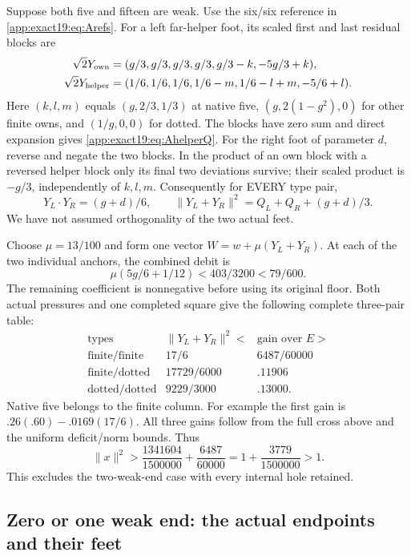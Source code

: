 \documentclass[11pt]{article}
\theoremstyle{definition}
\theoremstyle{remark}
\begin{document}
Suppose both five and fifteen
are weak.
Use the six/six reference in
\eqref{app:exact19:eq:Arefs}.
For a left far-helper foot,
its scaled first and last residual
blocks are
\[
\begin{split}
 \sqrt2Y_{\rm own}&=(g/3,g/3,g/3,g/3,g/3-k,-5g/3+k),\\
 \sqrt2Y_{\rm helper}&=(1/6,1/6,1/6,1/6-m,1/6-l+m,-5/6+l).
\end{split}
\]
Here \((k,l,m)\) equals
\((g,2/3,1/3)\) at native five,
\((g,2(1-g^2),0)\) for other finite
owns, and \((1/g,0,0)\) for dotted.
The blocks have zero sum and
direct expansion gives
\eqref{app:exact19:eq:AhelperQ}.
For the right foot of parameter
\(d\), reverse and negate the two
blocks.
In the product of an own block
with a reversed helper block only
its final two deviations survive;
their scaled product is \(-g/3\),
independently of \(k,l,m\).
Consequently for EVERY type pair,
\[
 Y_L\cdot Y_R=(g+d)/6,\qquad
          \|Y_L+Y_R\|^2=Q_L+Q_R+(g+d)/3 .
\]
We have not assumed orthogonality
of the two actual feet.

Choose \(\mu=13/100\) and form
one vector \(W=w+\mu(Y_L+Y_R)\).
At each of the two individual
anchors, the combined debit is
\[
           \mu(5g/6+1/12)
               <403/3200<79/600 .
\]
The remaining coefficient is
nonnegative before using its
original floor.
Both actual pressures and one
completed square give the following
complete three-pair table:
\[
\begin{array}{c|c|c}
 \text{types}&\|Y_L+Y_R\|^2<&\text{gain over }E>\\ \hline
 \text{finite/finite}&17/6&6487/60000\\
 \text{finite/dotted}&17729/6000&.11906\\
 \text{dotted/dotted}&9229/3000&.13000 .
\end{array}
\]
Native five belongs to the finite
column.
For example the first gain is
\(.26(.60)-.0169(17/6)\).
All three gains follow from the
full cross above and the uniform
deficit/norm bounds.
Thus
\[
            \|x\|^2>
               {\frac{1341604}{1500000}}+{\frac{6487}{60000}}
                     =1+{\frac{3779}{1500000}}>1 .
\]
This excludes the two-weak-end case
with every internal hole retained.

\subsection{Zero or one weak end: the actual endpoints and their feet}
\label{app:exact19:Aactualends}
\end{document}
